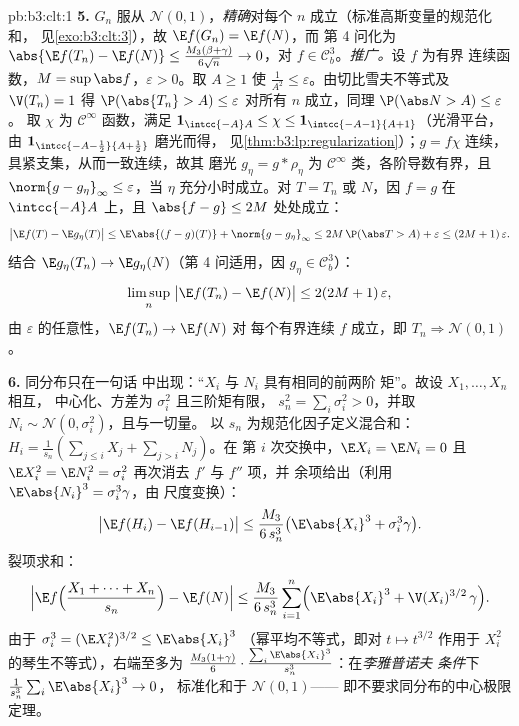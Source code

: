 \begin{solution}{pb:b3:clt:1}
\textbf{5.} $G_n$ 服从 $\mathcal N(0,1)$，\emph{精确}对每个
$n$ 成立（标准高斯变量的规范化和，
见\cref{exo:b3:clt:3}），故 $\E f(G_n) = \E f(N)$，而
第 4 问化为 $\abs{\E f(T_n) - \E f(N)} \leq
\frac{M_3(\beta+\gamma)}{6\sqrt n} \to 0$，对 $f \in
\mathcal C^3_b$。\emph{推广。}设 $f$ 为有界
连续函数，$M = \sup\abs f$，$\varepsilon > 0$。取 $A
\geq 1$ 使 $\frac1{A^2} \leq \varepsilon$。由切比雪夫不等式及
$\V(T_n) = 1$ 得 $\P(\abs{T_n} > A) \leq \varepsilon$
对所有 $n$ 成立，同理 $\P(\abs N > A) \leq \varepsilon$。
取 $\chi$ 为 $\mathcal C^\infty$ 函数，满足
$\mathbf 1_{\intcc{-A}A} \leq \chi \leq
\mathbf 1_{\intcc{-A-1}{A+1}}$（光滑平台，由
$\mathbf 1_{\intcc{-A-\frac12}{A+\frac12}}$ 磨光而得，
见\cref{thm:b3:lp:regularization}）；$g = f\chi$ 连续，
具紧支集，从而一致连续，故其
磨光 $g_\eta = g * \rho_\eta$ 为 $\mathcal
C^\infty$ 类，各阶导数有界，且
$\norm{g - g_\eta}_\infty \leq \varepsilon$，当 $\eta$
充分小时成立。对 $T = T_n$ 或 $N$，因 $f = g$ 在
$\intcc{-A}A$ 上，且 $\abs{f - g} \leq 2M$ 处处成立：
\[
\bigl|\E f(T) - \E g_\eta(T)\bigr| \leq
\E\abs{(f - g)(T)} + \norm{g - g_\eta}_\infty
\leq 2M\,\P(\abs T > A) + \varepsilon \leq
(2M + 1)\,\varepsilon .
\]
结合 $\E g_\eta(T_n) \to \E g_\eta(N)$（第
4 问适用，因 $g_\eta \in \mathcal C^3_b$）：
\[
\limsup_n\;\bigl|\E f(T_n) - \E f(N)\bigr| \leq
2(2M + 1)\,\varepsilon ,
\]
由 $\varepsilon$ 的任意性，$\E f(T_n) \to \E f(N)$ 对
每个有界连续 $f$ 成立，即 $T_n \Rightarrow
\mathcal N(0,1)$。

\textbf{6.} 同分布只在一句话
中出现：“$X_i$ 与 $N_i$ 具有相同的前两阶
矩”。故设 $X_1, \dots, X_n$ 相互，
中心化、方差为 $\sigma_i^2$ 且三阶矩有限，
$s_n^2 = \sum_i\sigma_i^2 > 0$，并取 $N_i \sim
\mathcal N(0, \sigma_i^2)$，且与一切量。
以 $s_n$ 为规范化因子定义混合和：$H_i =
\frac1{s_n}(\sum_{j\leq i}X_j + \sum_{j>i}N_j)$。在
第 $i$ 次交换中，$\E X_i = \E N_i = 0$ 且 $\E X_i^2 = \E N_i^2
= \sigma_i^2$ 再次消去 $f'$ 与 $f''$ 项，并
余项给出（利用 $\E\abs{N_i}^3 = \sigma_i^3\gamma$，由
尺度变换）：
\[
\bigl|\E f(H_i) - \E f(H_{i-1})\bigr| \leq
\frac{M_3}{6\,s_n^3}\bigl(\E\abs{X_i}^3 +
\sigma_i^3\gamma\bigr) .
\]
裂项求和：
\[
\Bigl|\E f\Bigl(\frac{X_1 + \dots + X_n}{s_n}\Bigr) -
\E f(N)\Bigr| \leq \frac{M_3}{6\,s_n^3}\sum_{i=1}^n
\Bigl(\E\abs{X_i}^3 + \V(X_i)^{3/2}\,\gamma\Bigr) .
\]
由于 $\sigma_i^3 = (\E X_i^2)^{3/2} \leq \E\abs{X_i}^3$
（幂平均不等式，即对 $t \mapsto
t^{3/2}$ 作用于 $X_i^2$ 的琴生不等式），右端至多为 
$\frac{M_3(1 + \gamma)}{6}\cdot
\frac{\sum_i\E\abs{X_i}^3}{s_n^3}$：在\emph{李雅普诺夫
条件}下 $\frac1{s_n^3}\sum_i\E\abs{X_i}^3 \to 0$，
标准化和于 $\mathcal N(0,1)$——
即不要求同分布的中心极限定理。


\end{solution}
